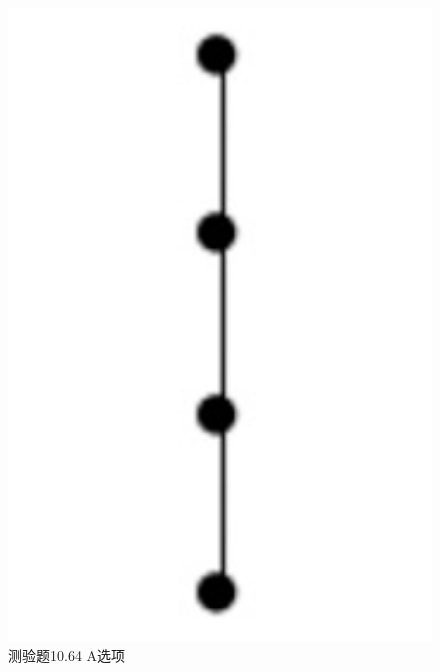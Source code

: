 \documentclass[UTF8, heading=true]{ctexart}
\begin{document}
\begin{figure}[H]
  \centering
  \begin{minipage}[t]{0.14\textwidth}
      \centering
      \includegraphics[width=1\textwidth]{10.64_1.jpg} %
      \vspace{-0.3cm}
      \caption{测验题10.64 A选项}
  \end{minipage}
  \hspace{0.23\textwidth} %
  \begin{minipage}[t]{0.2\textwidth}
      \centering

\end{minipage}
\end{figure}
\end{document}
